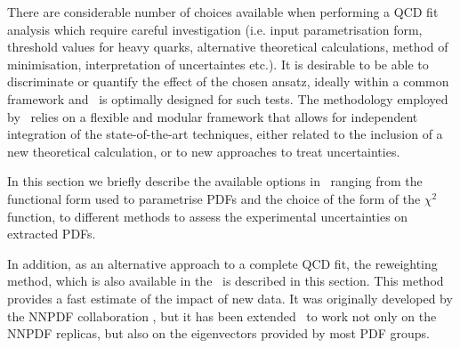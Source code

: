 



There are considerable number of choices available when performing a QCD fit analysis which require careful investigation (i.e. input parametrisation form, threshold values for heavy quarks, alternative theoretical calculations, method of minimisation, interpretation of uncertaintes etc.).
%
 It is desirable to be able to discriminate or quantify the effect of the chosen ansatz,  ideally within a common framework and 
\fitter\ is optimally designed for such tests.
%
The methodology employed by \fitter\  relies on a flexible and modular
framework that allows for independent integration of the state-of-the-art techniques, either related to the inclusion of a new theoretical calculation, or to new approaches to treat uncertainties. 
%

In this section we briefly describe the available options in \fitter\ ranging from the functional form used to parametrise PDFs and the choice of the form of the $\chi^2$ function, to different methods to assess the experimental uncertainties on extracted PDFs.

In addition, as an alternative approach to a complete QCD fit,  the reweighting
method, which is also available in the \fitter\, is described in this section. This method provides a fast estimate of the impact of new data. 
It was originally developed by the NNPDF collaboration \cite{Ball:2011gg,Ball:2010gb}, but it has been extended~\cite{Watt:2012tq} to work not only on the 
NNPDF replicas, 
but also on the eigenvectors provided by most PDF groups. 



